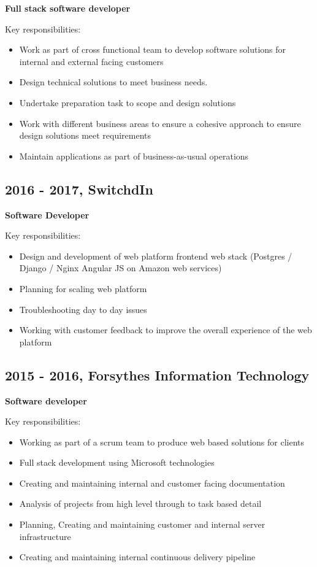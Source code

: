 \documentclass[11pt]{article}
\begin{document}
\textbf{Full stack software developer}

Key responsibilities:

\begin{itemize}
\item Work as part of cross functional team to develop software solutions for internal and external facing customers
\item Design technical solutions to meet business needs.
\item Undertake preparation task to scope and design solutions
\item Work with different business areas to ensure a cohesive approach to ensure design solutions meet requirements
\item Maintain applications as part of business-as-usual operations
\end{itemize}
\subsection*{2016 - 2017, SwitchdIn}
\label{sec:org361ebf2}

\textbf{Software Developer}

Key responsibilities:

\begin{itemize}
\item Design and development of web platform frontend web stack (Postgres / Django / Nginx Angular JS on Amazon web services)
\item Planning for scaling web platform
\item Troubleshooting day to day issues
\item Working with customer feedback to improve the overall experience of the web platform
\end{itemize}
\subsection*{2015 - 2016, Forsythes Information Technology}
\label{sec:orgf64bade}

\textbf{Software developer}

Key responsibilities:

\begin{itemize}
\item Working as part of a scrum team to produce web based solutions for clients
\item Full stack development using Microsoft technologies
\item Creating and maintaining internal and customer facing documentation
\item Analysis of projects from high level through to task based detail
\item Planning, Creating and maintaining customer and internal server infrastructure
\item Creating and maintaining internal continuous delivery pipeline
\end{itemize}
\end{document}
